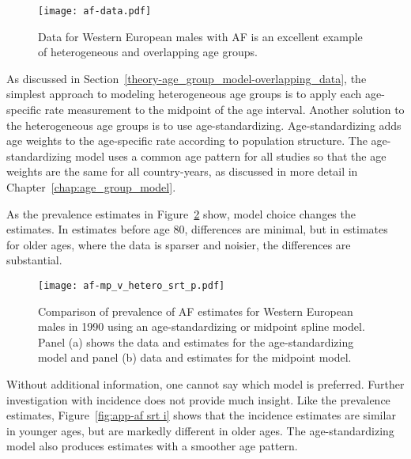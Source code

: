     \begin{figure}[h]
        \begin{center}
            \texttt{[image: af-data.pdf]}
            \caption{Data for Western European males with
              AF is an excellent example of heterogeneous
              and overlapping age groups.}
            \label{fig:app-af data}
        \end{center}
    \end{figure}

As discussed in Section~\ref{theory-age_group_model-overlapping_data},
the simplest approach to modeling heterogeneous age groups is to apply
each age-specific rate measurement to the midpoint of the age interval.
Another solution to the heterogeneous age groups is to use age-standardizing.
Age-standardizing adds age weights to the age-specific rate according
to population structure.  The age-standardizing model uses a common
age pattern for all studies so that the age weights are the same for
all country-years, as discussed in more detail in Chapter~\ref{chap:age_group_model}.

As the prevalence estimates in Figure~\ref{fig:app-af srt p} show,
model choice changes the estimates.  In estimates before age 80, 
differences are minimal, but in estimates for older ages, where the
data is sparser and noisier, the differences are substantial.

    \begin{figure}[h]
        \begin{center}
            \texttt{[image: af-mp\_v\_hetero\_srt\_p.pdf]}
            \caption{Comparison of prevalence of AF estimates for Western European
              males in 1990 using an age-standardizing
              or midpoint spline model.  Panel (a) shows the data and
              estimates for the age-standardizing model and panel (b)
              data and estimates for the midpoint model.}
            \label{fig:app-af srt p}
        \end{center}
    \end{figure}

Without additional information, one cannot say which model is preferred.
Further investigation with incidence does not provide much insight.  Like
the prevalence estimates, Figure~\ref{fig:app-af srt i} shows that the
incidence estimates are similar in younger ages, but are markedly different
in older ages.  The age-standardizing model also produces estimates with a
smoother age pattern.


